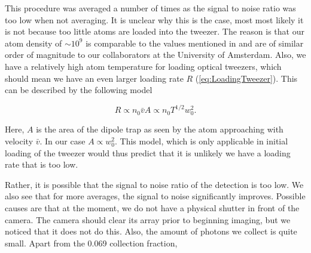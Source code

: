 This procedure was averaged a number of times as the signal to noise ratio was too low when not averaging. 
It is unclear why this is the case, most most likely it is not because too little atoms are loaded into the tweezer.
The reason is that our atom density of $\sim 10^9$ is comparable to the values mentioned in \cite{Schlosser2002} and are of similar order of magnitude to our collaborators at the University of Amsterdam.
Also, we have a relatively high atom temperature for loading optical tweezers, which should mean we have an even larger loading rate $R$ (\cref{eq:LoadingTweezer}).
This can be described by the following model \cite{Kuppens2000}

\begin{equation}
    R \propto n_0 \bar{v} A\propto n_0 T^{1/2} w_0^2.
\end{equation}

Here, $A$ is the area of the dipole trap as seen by the atom approaching with velocity $\bar{v}$. In our case $A \propto w_0^2$.
This model, which is only applicable in initial loading of the tweezer would thus predict that it is unlikely we have a loading rate that is too low. 

Rather, it is possible that the signal to noise ratio of the detection is too low. 
We also see that for more averages, the signal to noise significantly improves. 
Possible causes are that at the moment, we do not have a physical shutter in front of the camera. 
The camera should clear its array prior to beginning imaging, but we noticed that it does not do this. 
Also, the amount of photons we collect is quite small. Apart from the 0.069 collection fraction, 






